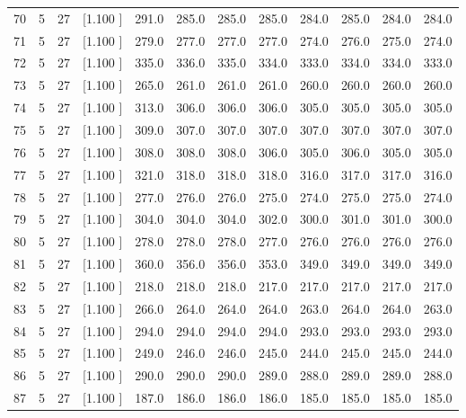 \documentclass[12pt,a4paper]{article}
\begin{document}
\begin{center}
{\begin{tabular}{r r r r r r r r r r r r}
  70&  5& 27&[1.100     ]&   291.0&   285.0&   285.0&   285.0&   284.0&   285.0&   284.0&   284.0\\[-0.02in]
  71&  5& 27&[1.100     ]&   279.0&   277.0&   277.0&   277.0&   274.0&   276.0&   275.0&   274.0\\[-0.02in]
  72&  5& 27&[1.100     ]&   335.0&   336.0&   335.0&   334.0&   333.0&   334.0&   334.0&   333.0\\[-0.02in]
  73&  5& 27&[1.100     ]&   265.0&   261.0&   261.0&   261.0&   260.0&   260.0&   260.0&   260.0\\[-0.02in]
  74&  5& 27&[1.100     ]&   313.0&   306.0&   306.0&   306.0&   305.0&   305.0&   305.0&   305.0\\[-0.02in]
  75&  5& 27&[1.100     ]&   309.0&   307.0&   307.0&   307.0&   307.0&   307.0&   307.0&   307.0\\[-0.02in]
  76&  5& 27&[1.100     ]&   308.0&   308.0&   308.0&   306.0&   305.0&   306.0&   305.0&   305.0\\[-0.02in]
  77&  5& 27&[1.100     ]&   321.0&   318.0&   318.0&   318.0&   316.0&   317.0&   317.0&   316.0\\[-0.02in]
  78&  5& 27&[1.100     ]&   277.0&   276.0&   276.0&   275.0&   274.0&   275.0&   275.0&   274.0\\[-0.02in]
  79&  5& 27&[1.100     ]&   304.0&   304.0&   304.0&   302.0&   300.0&   301.0&   301.0&   300.0\\[-0.02in]
  80&  5& 27&[1.100     ]&   278.0&   278.0&   278.0&   277.0&   276.0&   276.0&   276.0&   276.0\\[-0.02in]
  81&  5& 27&[1.100     ]&   360.0&   356.0&   356.0&   353.0&   349.0&   349.0&   349.0&   349.0\\[-0.02in]
  82&  5& 27&[1.100     ]&   218.0&   218.0&   218.0&   217.0&   217.0&   217.0&   217.0&   217.0\\[-0.02in]
  83&  5& 27&[1.100     ]&   266.0&   264.0&   264.0&   264.0&   263.0&   264.0&   264.0&   263.0\\[-0.02in]
  84&  5& 27&[1.100     ]&   294.0&   294.0&   294.0&   294.0&   293.0&   293.0&   293.0&   293.0\\[-0.02in]
  85&  5& 27&[1.100     ]&   249.0&   246.0&   246.0&   245.0&   244.0&   245.0&   245.0&   244.0\\[-0.02in]
  86&  5& 27&[1.100     ]&   290.0&   290.0&   290.0&   289.0&   288.0&   289.0&   289.0&   288.0\\[-0.02in]
  87&  5& 27&[1.100     ]&   187.0&   186.0&   186.0&   186.0&   185.0&   185.0&   185.0&   185.0\\[-0.02in]

\end{tabular}}
\end{center}
\end{document}
